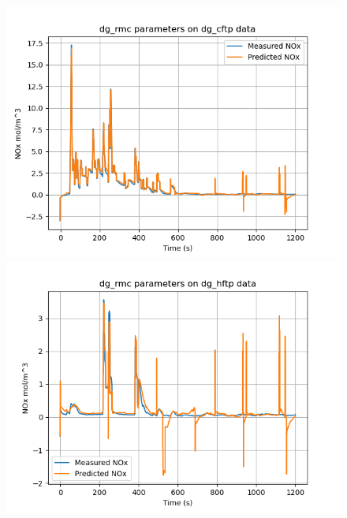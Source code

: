 \begin{figure}[H]
        \begin{minipage}{0.33\textwidth}
                \includegraphics[width = \textwidth]{./figs/figs_new_mdl/dg_rmc_dg_cftp.png}
        \end{minipage}
        \begin{minipage}{0.33\textwidth}
                \includegraphics[width = \textwidth]{./figs/figs_new_mdl/dg_rmc_dg_hftp.png}
        \end{minipage}
        \begin{minipage}{0.33\textwidth}

\end{minipage}
\end{figure}
